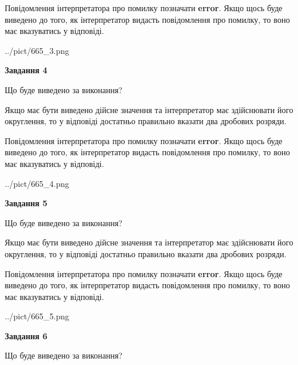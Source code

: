\documentclass[12pt, ukrainian]{article}
\begin{document}
{\begin {Large}
Повідомлення інтерпретатора про помилку позначати \textbf{error}.
Якщо щось буде виведено до того, як інтерпретатор видасть повідомлення про помилку, 
то воно має вказуватись у відповіді. \par

\begin{center}
	{../pict/665_3.png}
\end{center}
\newpage

{\begin {center}\textbf{Завдання 4}\end {center}}\par
Що буде виведено за виконання? \par

Якщо має бути виведено дійсне значення та інтерпретатор має здійснювати його округлення, 
то у відповіді достатньо правильно вказати два дробових розряди.

Повідомлення інтерпретатора про помилку позначати \textbf{error}.
Якщо щось буде виведено до того, як інтерпретатор видасть повідомлення про помилку, 
то воно має вказуватись у відповіді. \par

\begin{center}
	{../pict/665_4.png}
\end{center}
\newpage

{\begin {center}\textbf{Завдання 5}\end {center}}\par
Що буде виведено за виконання? \par

Якщо має бути виведено дійсне значення та інтерпретатор має здійснювати його округлення, 
то у відповіді достатньо правильно вказати два дробових розряди.

Повідомлення інтерпретатора про помилку позначати \textbf{error}.
Якщо щось буде виведено до того, як інтерпретатор видасть повідомлення про помилку, 
то воно має вказуватись у відповіді. \par

\begin{center}
	{../pict/665_5.png}
\end{center}
\newpage

{\begin {center}\textbf{Завдання 6}\end {center}}\par
Що буде виведено за виконання? \par


\end{Large}}
\end{document}
